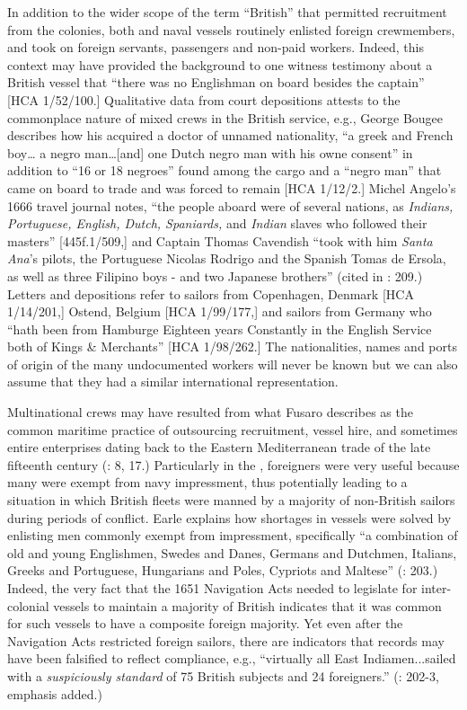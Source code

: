  In addition to the wider scope of the term “British” that permitted recruitment from the colonies, both  and naval vessels routinely enlisted foreign crewmembers, and took on foreign servants, passengers and non-paid workers. Indeed, this context may have provided the background to one witness testimony about a British vessel that “there was no Englishman on board besides the captain” [HCA 1/52/100.] Qualitative data from court depositions attests to the commonplace nature of mixed crews in the British service, e.g., George Bougee describes how his  acquired a doctor of unnamed nationality, “a greek and French boy… a negro man…[and] one Dutch negro man with his owne consent” in addition to “16 or 18 negroes” found among the cargo and a “negro man” that came on board to trade and was forced to remain [HCA 1/12/2.] Michel Angelo’s 1666 travel journal notes, “the people aboard were of several nations, as \textit{Indians, Portuguese, English, Dutch, Spaniards,} and \textit{Indian} slaves who followed their masters” [445f.1/509,] and Captain Thomas Cavendish “took with him \textit{Santa Ana}’s pilots, the Portuguese Nicolas Rodrigo and the Spanish Tomas de Ersola, as well as three Filipino boys - and two Japanese brothers” (cited in \citealt{Bicheno2012}: 209.) Letters and depositions refer to sailors from Copenhagen, Denmark [HCA 1/14/201,] Ostend, Belgium [HCA 1/99/177,] and sailors from Germany who “hath been from Hamburge Eighteen years Constantly in the English Service both of Kings \& Merchants” [HCA 1/98/262.] The nationalities, names and ports of origin of the many undocumented workers will never be known but we can also assume that they had a similar international representation.

Multinational crews may have resulted from what Fusaro describes as the common maritime practice of outsourcing  recruitment, vessel hire, and sometimes entire enterprises dating back to the Eastern Mediterranean trade of the late fifteenth century (\citeyear*{2015}: 8, 17.) Particularly in the , foreigners were very useful because many were exempt from navy impressment, thus potentially leading to a situation in which British  fleets were manned by a majority of non-British sailors during periods of conflict. Earle explains how  shortages in  vessels were solved by enlisting men commonly exempt from impressment, specifically “a combination of old and young Englishmen, Swedes and Danes, Germans and Dutchmen, Italians, Greeks and Portuguese, Hungarians and Poles, Cypriots and Maltese” (\citealt{Earle1998}: 203.) Indeed, the very fact that the 1651 Navigation Acts needed to legislate for inter-colonial  vessels to maintain a majority of British  indicates that it was common for such vessels to have a composite foreign majority. Yet even after the Navigation Acts restricted foreign sailors, there are indicators that records may have been falsified to reflect compliance, e.g., “virtually all East Indiamen...sailed with a \textit{suspiciously standard}  of 75 British subjects and 24 foreigners.” (\citealt{Earle1998}: 202-3, emphasis added.) 

